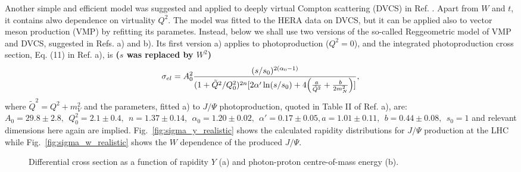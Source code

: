 \documentclass[12pt]{article}
\begin{document}
Another simple and efficient model was suggested and applied to deeply virtual Compton scattering (DVCS) in Ref. \cite{Capua}. Apart from $W$ and $t$, it contains alwo dependence on virtuality $Q^2$.
The model was fitted to the HERA data on DVCS, but it can be applied also to vector meson production (VMP) by refitting its parametes.
Instead, below we shall use two versions of the so-called Reggeometric model of VMP and DVCS, suggested in Refs. \cite{Fazio}a) and \cite{Fazio}b).
Its first version \cite{Fazio} a) applies to photoproduction ($Q^2=0$), and the integrated photoproduction cross section, Eq. (11) in Ref. \cite{Fazio}a), is {\bf($s$ was replaced by $W^2$)}
\begin{equation}
\sigma_{el}=A_0^2\frac{(s/s_0)^{2(\alpha_0-1)}}{(1+\tilde Q^2/Q^2_0)^{2n}[2\alpha'\ln(s/s_0)+4\Bigl(\frac{a}{\tilde Q^2}+\frac{b}{2m_N^2}\Bigr)]},
\end{equation}
where $\tilde Q^2=Q^2+m_V^2$ and the parameters, fitted \cite{Fazio}a) to $J/\Psi$ photoproduction, quoted in
Table II of Ref. \cite{Fazio}a), are: $A_0=29.8\pm 2.8,\ \ Q_0^2=2.1\pm 0.4,\ \ 
n=1.37\pm 0.14,\ \ \alpha_0 =1.20\pm 0.02,\ \ \alpha'=0.17\pm 0.05, a=1.01\pm 0.11,\ \ b=0.44\pm 0.08,\ \ s_0=1$ and relevant dimensions here again are implied.
Fig.~\ref{fig:sigma_y_realistic} shows the calculated rapidity distributions for $J/\Psi$ production at the LHC while Fig.~\ref{fig:sigma_w_realistic} shows the $W$ dependence of the produced $J/\Psi$.

\begin{figure}[!h]
  \centering
  \caption{Differential cross section as a function of rapidity $Y$ (a) and photon-proton centre-of-mass energy (b).}
\end{figure}
\end{document}
